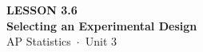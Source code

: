 \documentclass[aspectratio=169, 11pt]{beamer}
\begin{document}
{
\begin{frame}[plain]
  \vspace{2.8cm}\hspace{0.55cm}%
  \begin{minipage}{0.9\textwidth}
    {\color{goldacc}\bfseries\small LESSON 3.6}\\[0.5cm]
    {\color{white}\bfseries\LARGE Selecting an Experimental Design}\\[1.2cm]
    {\color{skymid}\small AP Statistics~$\cdot$~Unit 3}
  \end{minipage}
\end{frame}
}

\begin{frame}[t, plain]
\end{frame}
\end{document}
